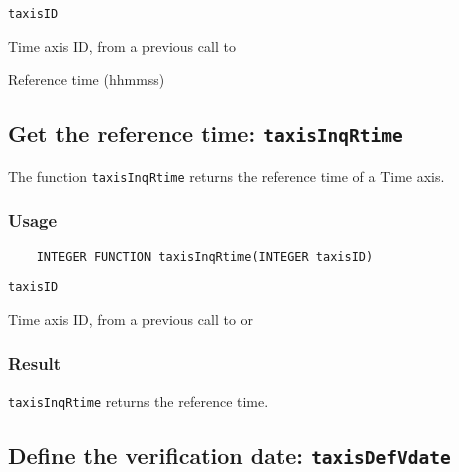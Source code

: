 \hspace*{4mm}\begin{minipage}[]{15cm}
\begin{deflist}{\tt taxisID\ }
\item[{\tt taxisID}]
Time axis ID, from a previous call to {}
\item[{\tt rtime}]
Reference time (hhmmss)

\end{deflist}
\end{minipage}


\subsection{Get the reference time: {\tt taxisInqRtime}}
\label{taxisInqRtime}

The function {\tt taxisInqRtime} returns the reference time of a Time axis.

\subsubsection*{Usage}

\begin{verbatim}
    INTEGER FUNCTION taxisInqRtime(INTEGER taxisID)
\end{verbatim}

\hspace*{4mm}\begin{minipage}[]{15cm}
\begin{deflist}{\tt taxisID\ }
\item[{\tt taxisID}]
Time axis ID, from a previous call to {} or {}

\end{deflist}
\end{minipage}

\subsubsection*{Result}

{\tt taxisInqRtime} returns the reference time.



\subsection{Define the verification date: {\tt taxisDefVdate}}
\label{taxisDefVdate}

